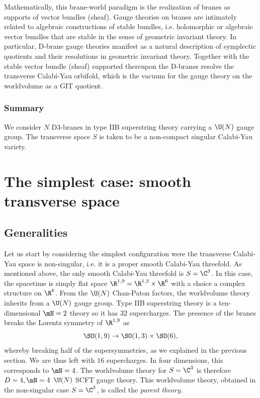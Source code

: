 \documentclass{worksheetclass}
\begin{document}
        Mathematically, this brane-world paradigm is the realization of branes as supports of vector bundles (sheaf). Gauge theories on branes are intimately related to algebraic constructions of stable bundles, i.e. holomorphic or algebraic vector bundles that are stable in the sense of geometric invariant theory. In particular, D-brane gauge theories manifest as a natural description of symplectic quotients and their resolutions in geometric invariant theory. Together with the stable vector bundle (sheaf) supported thereupon the D-branes resolve the transverse Calabi-Yau orbifold, which is the vacuum for the gauge theory on the worldvolume as a GIT quotient.

    \subsubsection*{Summary}

        We consider $N$ D$3$-branes in type IIB superstring theory carrying a $\U(N)$ gauge group. The transverse space $S$ is taken to be a non-compact singular Calabi-Yau variety.

\section{The simplest case: smooth transverse space}

    \subsection{Generalities}

        Let us start by considering the simplest configuration were the transverse Calabi-Yau space is non-singular, i.e. it is a proper smooth Calabi-Yau threefold. As mentioned above, the only smooth Calabi-Yau threefold is $S=\C^3$. In this case, the spacetime is simply flat space $\R^{1,9}=\R^{1,3}\times\R^6$ with a choice a complex structure on $\R^6$. From the $\U(N)$ Chan-Paton factors, the worldvolume theory inherits from a $\U(N)$ gauge group. Type IIB superstring theory is a ten-dimensional $\mN=2$ theory so it has $32$ supercharges. The presence of the branes breaks the Lorentz symmetry of $\R^{1,9}$ as
        \begin{equation}
            \SO(1,9)\to\SO(1,3)\times\SO(6),
        \end{equation}
        whereby breaking half of the supersymmetries, as we explained in the previous section. We are thus left with $16$ supercharges. In four dimensions, this corresponds to $\mN=4$. The worldvolume theory for $S=\C^3$ is therefore $D=4,\mN=4$ $\U(N)$ SCFT gauge theory. This worldvolume theory, obtained in the non-singular case $S=\C^3$, is called the \emph{parent theory}.
\end{document}
